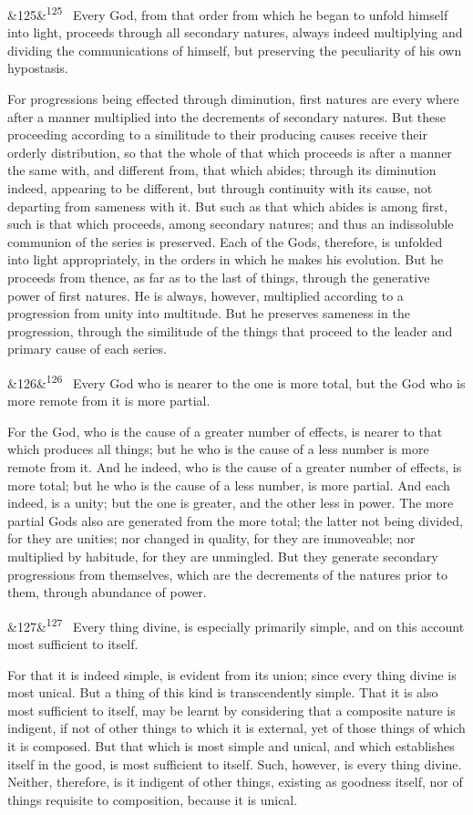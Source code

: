 \documentclass[12pt]{article}
\newcommand{\para}[1][]{\par\noindent\ifx&#1&\else\textsuperscript{\footnotesize #1}~\fi}
\begin{document}
\para[125] Every God, from that order from which he began to unfold himself into light, proceeds through all secondary natures, always indeed multiplying and dividing the communications of himself, but preserving the peculiarity of his own hypostasis.

For progressions being effected through diminution, first natures are every where after a manner multiplied into the decrements of secondary natures. But these proceeding according to a similitude to their producing causes receive their orderly distribution, so that the whole of that which proceeds is after a manner the same with, and different from, that which abides; through its diminution indeed, appearing to be different, but through continuity with its cause, not departing from sameness with it. But such as that which abides is among first, such is that which proceeds, among secondary natures; and thus an indissoluble communion of the series is preserved. Each of the Gods, therefore, is unfolded into light appropriately, in the orders in which he makes his evolution. But he proceeds from thence, as far as to the last of things, through the generative power of first natures. He is always, however, multiplied according to a progression from unity into multitude. But he preserves sameness in the progression, through the similitude of the things that proceed to the leader and primary cause of each series.

\para[126] Every God who is nearer to the one is more total, but the God who is more remote from it is more partial.

For the God, who is the cause of a greater number of effects, is nearer to that which produces all things; but he who is the cause of a less number is more remote from it. And he indeed, who is the cause of a greater number of effects, is more total; but he who is the cause of a less number, is more partial. And each indeed, is a unity; but the one is greater, and the other less in power. The more partial Gods also are generated from the more total; the latter not being divided, for they are unities; nor changed in quality, for they are immoveable; nor multiplied by habitude, for they are unmingled. But they generate secondary progressions from themselves, which are the decrements of the natures prior to them, through abundance of power.

\para[127] Every thing divine, is especially primarily simple, and on this account most sufficient to itself.

For that it is indeed simple, is evident from its union; since every thing divine is most unical. But a thing of this kind is transcendently simple. That it is also most sufficient to itself, may be learnt by considering that a composite nature is indigent, if not of other things to which it is external, yet of those things of which it is composed. But that which is most simple and unical, and which establishes itself in the good, is most sufficient to itself. Such, however, is every thing divine. Neither, therefore, is it indigent of other things, existing as goodness itself, nor of things requisite to composition, because it is unical.
\end{document}
